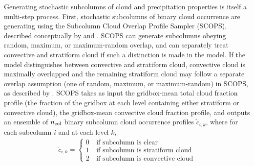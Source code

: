 Generating stochastic subcolumns of cloud and precipitation properties is itself a multi-step process. First, stochastic subcolumns of binary cloud occurrence are generating using the Subcolumn Cloud Overlap Profile Sampler (SCOPS), described conceptually by \cite{klein_and_jakob_1999} and \cite{webb_et_al_2001}. SCOPS can generate subcolumns obeying random, maximum, or maximum-random overlap, and can separately treat convective and stratiform cloud if such a distinction is made in the model. If the model distinguishes between convective and stratiform cloud, convective cloud is maximally overlapped and the remaining stratiform cloud may follow a separate overlap assumption (one of random, maximum, or maximum-random) in SCOPS, as described by \cite{webb_et_al_2001}. SCOPS takes as input the gridbox-mean total cloud fraction profile (the fraction of the gridbox at each level containing either stratiform or convective cloud), the gridbox-mean convective cloud fraction profile, and outputs an ensemble of $n_{\rm col}$ binary subcolumn cloud occurrence profiles $\tilde{c}_{i, k}$, where for each subcolumn $i$ and at each level $k$,
\begin{gather}
    \tilde{c}_{i, k} = \begin{cases}
         0 & ~\text{if subcolumn is clear} \\
         1 & ~\text{if subcolumn is stratiform cloud} \\
         2 & ~\text{if subcolumn is convective cloud}
    \end{cases}
\end{gather}

